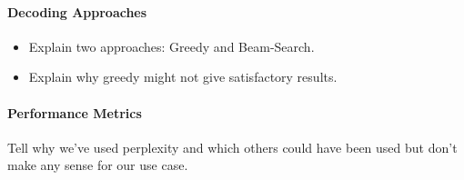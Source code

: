 \paragraph{Decoding Approaches}
\begin{itemize}
	\item Explain two approaches: Greedy and Beam-Search.
	\item Explain why greedy might not give satisfactory results.
\end{itemize}

\paragraph{Performance Metrics}
Tell why we've used perplexity and which others could have been used but don't make any sense for our use case.
